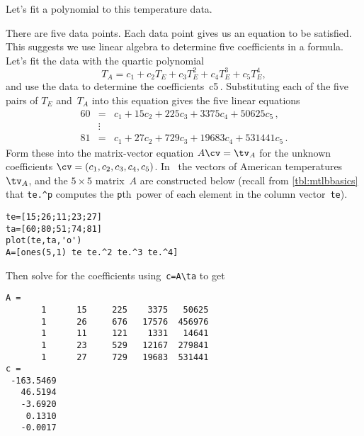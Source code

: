 \begin{example}
Let's fit a polynomial to this temperature data.
\begin{solution}
There are five data points.
Each data point gives us an equation to be satisfied.
This suggests we use linear algebra to determine five coefficients in a formula.
Let's fit the data with the quartic polynomial
\begin{equation}
T_A=c_1+c_2T_E+c_3T_E^2+c_4T_E^3+c_5T_E^4,
\label{eq:infertemp2}
\end{equation}
and use the data to determine the coefficients~\hlist c5\,.
Substituting each of the five pairs of \(T_E\) and~\(T_A\) into this equation gives the five linear equations
\begin{eqnarray*}
60&=&c_1+15c_2+225c_3+3375c_4+50625c_5\,, \\
&\vdots&\\
81&=&c_1+27c_2+729c_3+19683c_4+531441c_5\,.
\end{eqnarray*}
Form these into the matrix-vector equation \(A\cv=\tv_A\) for the unknown coefficients \(\cv=(c_1,c_2,c_3,c_4,c_5)\).
In \script\ the vectors of American temperatures~\(\tv_A\), and the \(5\times5\) matrix~\(A\) are constructed below (recall from \cref{tbl:mtlbbasics} that \verb|te.^p| computes the \verb|p|th~power of each element in the column vector~\verb|te|).
\setbox\ajrqrbox\hbox{}%
\marginajrbox%
\begin{verbatim}
te=[15;26;11;23;27]
ta=[60;80;51;74;81]
plot(te,ta,'o')
A=[ones(5,1) te te.^2 te.^3 te.^4]
\end{verbatim}
Then solve for the coefficients using~\verb|c=A\ta| to get
\begin{verbatim}
A =
       1      15     225    3375   50625
       1      26     676   17576  456976
       1      11     121    1331   14641
       1      23     529   12167  279841
       1      27     729   19683  531441
c =
 -163.5469
   46.5194
   -3.6920
    0.1310
   -0.0017
\end{verbatim}


\end{solution}
\end{example}
